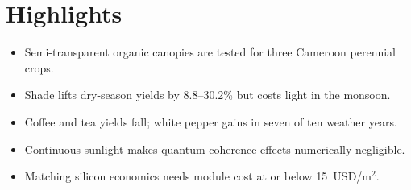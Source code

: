 \documentclass[12pt]{article}
\begin{document}
\section*{Highlights}
\begin{itemize}
  \item Semi-transparent organic canopies are tested for three Cameroon perennial crops.
  \item Shade lifts dry-season yields by 8.8--30.2\% but costs light in the monsoon.
  \item Coffee and tea yields fall; white pepper gains in seven of ten weather years.
  \item Continuous sunlight makes quantum coherence effects numerically negligible.
  \item Matching silicon economics needs module cost at or below 15~USD/m$^2$.
\end{itemize}
\end{document}
